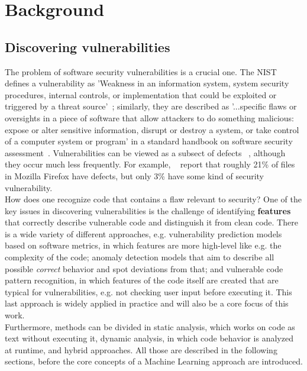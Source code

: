 \documentclass[
	a4paper,
	pagesize,
	pdftex,
	12pt,
	twoside, %
	BCOR=5mm, %
	ngerman,
	fleqn,
	final,
	]{scrartcl}
\begin{document}
\newpage
\section{Background}

\subsection{Discovering vulnerabilities}

The problem of software security vulnerabilities is a crucial one. The NIST defines a vulnerability as 'Weakness in an information system, system security procedures, internal controls, or implementation that could be exploited or triggered by a threat source'~\cite{NISTComputerSecurityRessourceCenter.}; similarly, they are described as '...specific flaws or oversights in a piece of software that allow attackers to do something malicious: expose or alter sensitive information, disrupt or destroy a system, or take control of a computer system or program' in a standard handbook on software security assessment~\cite{Dowd.2006}.
Vulnerabilities can be viewed as a subsect of defects ~\cite{Morrison.2015}, although they occur much less frequently. For example, ~\cite{Shin.2013} report that roughly 21\% of files in Mozilla Firefox have defects, but only 3\% have some kind of security vulnerability. \\
How does one recognize code that contains a flaw relevant to security? One of the key issues in discovering vulnerabilities is the challenge of identifying \textbf{features} that correctly describe vulnerable code and distinguish it from clean code. There is a wide variety of different approaches\citep{Ghaffarian.2017}, e.g. vulnerability prediction models based on software metrics, in which features are more high-level like e.g. the complexity of the code; anomaly detection models that aim to describe all possible \textit{correct} behavior and spot deviations from that; and vulnerable code pattern recognition, in which features of the code itself are created that are typical for vulnerabilities, e.g. not checking user input before executing it. This last approach is widely applied in practice and will also be a core focus of this work.\\
Furthermore, methods can be divided in static analysis, which works on code as text without executing it, dynamic analysis, in which code behavior is analyzed at runtime, and hybrid approaches. All those are described in the following sections, before the core concepts of a Machine Learning approach are introduced.
\end{document}
